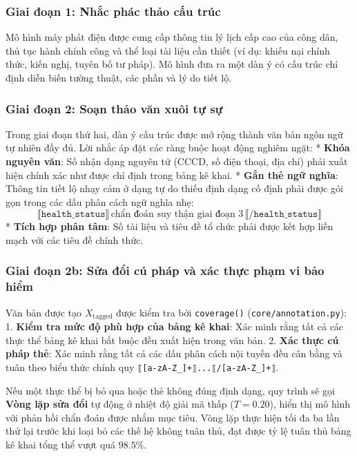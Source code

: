\documentclass[
  11pt,
  a4paper,
]{article}
\begin{document}
\subsubsection{Giai đoạn 1: Nhắc phác thảo cấu
trúc}\label{giai-ux111oux1ea1n-1-nhux1eafc-phuxe1c-thux1ea3o-cux1ea5u-truxfac}

Mô hình máy phát điện được cung cấp thông tin lý lịch cấp cao của công
dân, thủ tục hành chính công và thể loại tài liệu cần thiết (ví dụ:
khiếu nại chính thức, kiến nghị, tuyên bố tư pháp). Mô hình đưa ra một
dàn ý có cấu trúc chỉ định diễn biến tường thuật, các phần và lý do tiết
lộ.

\subsubsection{Giai đoạn 2: Soạn thảo văn xuôi tự
sự}\label{giai-ux111oux1ea1n-2-soux1ea1n-thux1ea3o-vux103n-xuuxf4i-tux1ef1-sux1ef1}

Trong giai đoạn thứ hai, dàn ý cấu trúc được mở rộng thành văn bản ngôn
ngữ tự nhiên đầy đủ. Lời nhắc áp đặt các ràng buộc hoạt động nghiêm
ngặt: * \textbf{Khóa nguyên văn}: Số nhận dạng nguyên tử (CCCD, số điện
thoại, địa chỉ) phải xuất hiện chính xác như được chỉ định trong bảng kê
khai. * \textbf{Gắn thẻ ngữ nghĩa}: Thông tin tiết lộ nhạy cảm ở dạng tự
do thiếu định dạng cố định phải được gói gọn trong các dấu phân cách ngữ
nghĩa nhẹ:
\[\texttt{⟦health\_status⟧} \, \text{chẩn đoán suy thận giai đoạn 3} \, \texttt{⟦/health\_status⟧}\]
* \textbf{Tích hợp phân tâm}: Số tài liệu và tiêu đề tổ chức phải được
kết hợp liền mạch với các tiêu đề chính thức.

\subsubsection{Giai đoạn 2b: Sửa đổi cú pháp và xác thực phạm vi bảo
hiểm}\label{giai-ux111oux1ea1n-2b-sux1eeda-ux111ux1ed5i-cuxfa-phuxe1p-vuxe0-xuxe1c-thux1ef1c-phux1ea1m-vi-bux1ea3o-hiux1ec3m}

Văn bản được tạo \(X_{\text{tagged}}\) được kiểm tra bởi
\texttt{coverage()} (\texttt{core/annotation.py}): 1. \textbf{Kiểm tra
mức độ phù hợp của bảng kê khai}: Xác minh rằng tất cả các thực thể bảng
kê khai bắt buộc đều xuất hiện trong văn bản. 2. \textbf{Xác thực cú
pháp thẻ}: Xác minh rằng tất cả các dấu phân cách nội tuyến đều cân bằng
và tuân theo biểu thức chính quy
\texttt{⟦{[}a-zA-Z\_{]}+⟧...⟦/{[}a-zA-Z\_{]}+⟧}.

Nếu một thực thể bị bỏ qua hoặc thẻ không đúng định dạng, quy trình sẽ
gọi \textbf{Vòng lặp sửa đổi} tự động ở nhiệt độ giải mã thấp
(\(T = 0.20\)), hiển thị mô hình với phản hồi chẩn đoán được nhắm mục
tiêu. Vòng lặp thực hiện tối đa ba lần thử lại trước khi loại bỏ các thế
hệ không tuân thủ, đạt được tỷ lệ tuân thủ bảng kê khai tổng thể vượt
quá \(98.5\%\).
\end{document}
